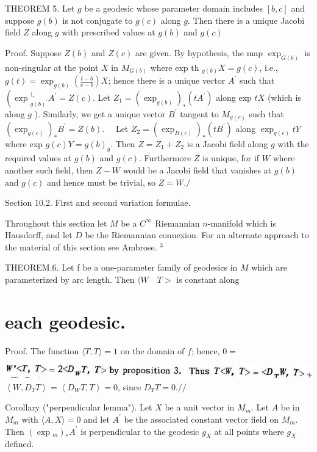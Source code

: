 \documentclass[10pt]{article}
\begin{document}
THEOREM 5. Let $g$ be a geodesic whose parameter domain includes $[b, c]$ and suppose $g(b)$ is not conjugate to $g(c)$ along $g$. Then there is a unique Jacobi field $Z$ along $g$ with prescribed values at $g(b)$ and $g(c)$

Proof. Suppose $Z(b)$ and $Z(c)$ are given. By hypothesis, the map $\exp _{G(b)}$ is non-singular at the point $X$ in $M_{G(b)}$ where exp th $_{g(b)} X=g(c)$, i.e., $g(t)=\exp _{g(b)}\left(\frac{t-b}{c-b}\right) X$; hence there is a unique vector $A^{\prime}$ such that $\left(\exp { }_{g(b)^{\prime}}^{)_{*}} A^{\prime}=Z(c)\right.$. Let $Z_{1}=\left(\exp _{g(b)}\right)_{*}\left(t A^{\prime}\right)$ along exp $t X$ (which is along $g$ ). Similarly, we get a unique vector $B^{\prime}$ tangent to $M_{g(c)}$ such that $\left(\exp _{g(c)}\right)_{*} B^{\prime}=Z(b) . \quad$ Let $Z_{2}=\left(\exp _{B(c)}\right)_{*}\left(t B^{\prime}\right)$ along $\exp _{g(c)} t Y$ where exp $g(c) Y=g(b)_{g}$. Then $Z=Z_{1}+Z_{2}$ is a Jacobi field along $g$ with the required values at $g(b)$ and $g(c) .$ Furthermore $Z$ is unique, for if $W$ where another such field, then $Z-W$ would be a Jacobi field that vanishes at $g(b)$ and $g(c)$ and hence must be trivial, so $Z=W . /$

Section 10.2. First and second variation formulae.

Throughout this section let $M$ be a $C^{\infty}$ Riemannian $n$-manifold which is Hausdorff, and let $D$ be the Riemannian connexion. For an alternate approach to the material of this section see Ambrose. ${ }^{3}$

THEOREM.6. Let f be a one-parameter family of geodesics in $M$ which are parameterized by arc length. Then $\langle W \quad T>$ is constant along

\section{each geodesic.}
Proof. The function $\langle T, T\rangle=1$ on the domain of $f$; hence, $0=$

\includegraphics[max width=\textwidth]{2022_07_16_f4e476ee2159dc67e746g-78}\\
$\left\langle W, D_{T} T\right\rangle=\left\langle D_{W} T, T\right\rangle=0$, since $D_{T} T=0 . / /$

Corollary ("perpendicular lemma"). Let $X$ be a unit vector in $M_{m}$. Let $A$ be in $M_{m}$ with $\langle A, X\rangle=0$ and let $A^{\prime}$ be the associated constant vector field on $M_{m}$. Then $\left(\exp { }_{m}\right)_{*} A^{\prime}$ is perpendicular to the geodesic $g_{X}$ at all points where $g_{X}$ defined.
\end{document}
